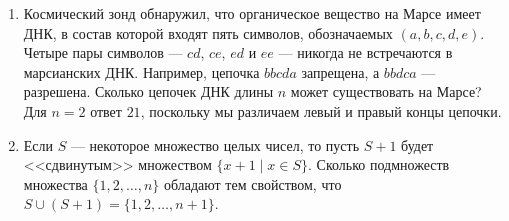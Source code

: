 \documentclass[14pt]{book}
\begin{document}
\begin{enumerate}
\item Космический зонд обнаружил, что органическое вещество на Марсе имеет ДНК, в состав
      которой входят пять символов, обозначаемых $(a, b, c, d, e)$. Четыре пары символов
      --- $cd$, $ce$, $ed$ и $ee$ --- никогда не встречаются в марсианских ДНК.
      Например, цепочка $bbcda$ запрещена, а $bbdca$ --- разрешена.
      Сколько цепочек ДНК длины $n$ может существовать на Марсе?
      Для $n=2$ ответ $21$, поскольку мы различаем левый и правый концы цепочки.

\item Если $S$ --- некоторое множество целых чисел, то пусть $S+1$ будет <<сдвинутым>>
множеством $\{x+1 \mid x \in S\}$. Сколько подмножеств множества $\{1,2,\ldots,n\}$ обладают
тем свойством, что $S\cup(S+1) = \{1,2,\ldots,n+1\}$.

\end{enumerate}
\end{document}
